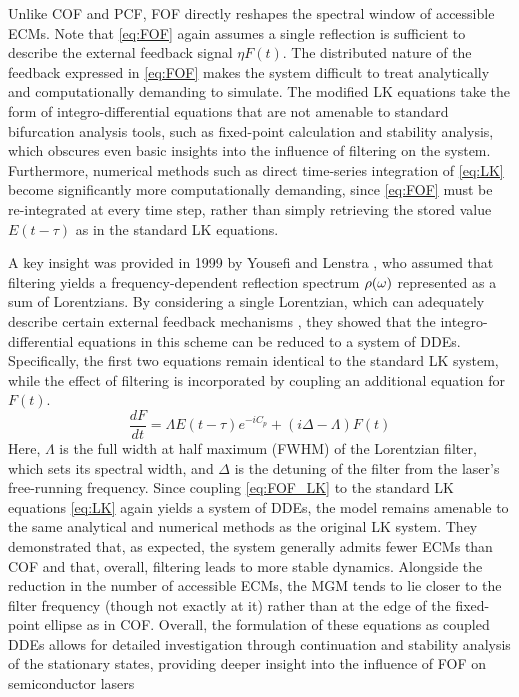 Unlike COF and PCF, FOF directly reshapes the spectral window of accessible ECMs.
Note that \eqref{eq:FOF} again assumes a single reflection is sufficient to describe the external feedback signal $\eta F(t)$.
The distributed nature of the feedback expressed in \eqref{eq:FOF} makes the system difficult to treat analytically and computationally demanding to simulate.
The modified LK equations take the form of integro-differential equations that are not amenable to standard bifurcation analysis tools, such as fixed-point calculation and stability analysis, which obscures even basic insights into the influence of filtering on the system.
Furthermore, numerical methods such as direct time-series integration of \eqref{eq:LK} become significantly more computationally demanding, since \eqref{eq:FOF} must be re-integrated at every time step, rather than simply retrieving the stored value $E(t-\tau)$ as in the standard LK equations.
%
\par
%
A key insight was provided in 1999 by Yousefi and Lenstra \cite{yousefi1999dynamical}, who assumed that filtering yields a frequency-dependent reflection spectrum $\rho(\omega)$ represented as a sum of Lorentzians.
By considering a single Lorentzian, which can adequately describe certain external feedback mechanisms \cite{dahmani1987frequency,detienne1997semiconductor}, they showed that the integro-differential equations in this scheme can be reduced to a system of DDEs.
Specifically, the first two equations remain identical to the standard LK system, while the effect of filtering is incorporated by coupling an additional equation for $F(t)$.
%
\begin{equation}
\label{eq:FOF_LK}
    \frac{d F}{d t} = \Lambda E(t-\tau) e^{-i C_p}+(i \Delta-\Lambda) F(t)
\end{equation}
%
Here, $\Lambda$ is the full width at half maximum (FWHM) of the Lorentzian filter, which sets its spectral width, and $\Delta$ is the detuning of the filter from the laser’s free-running frequency.
Since coupling \eqref{eq:FOF_LK} to the standard LK equations \eqref{eq:LK} again yields a system of DDEs, the model remains amenable to the same analytical and numerical methods as the original LK system.
They demonstrated that, as expected, the system generally admits fewer ECMs than COF and that, overall, filtering leads to more stable dynamics.
Alongside the reduction in the number of accessible ECMs, the MGM tends to lie closer to the filter frequency (though not exactly at it) rather than at the edge of the fixed-point ellipse as in COF.
Overall, the formulation of these equations as coupled DDEs allows for detailed investigation through continuation and stability analysis of the stationary states, providing deeper insight into the influence of FOF on semiconductor lasers 

